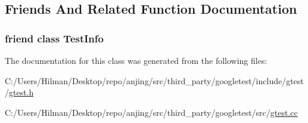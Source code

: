 \subsection{Friends And Related Function Documentation}
\hypertarget{classtesting_1_1_test_a4c49c2cdb6c328e6b709b4542f23de3c}{}
\subsubsection[{Test\+Info}]{\setlength{\rightskip}{0pt plus 5cm}friend class {\bf Test\+Info}\hspace{0.3cm}{\ttfamily [friend]}}\label{classtesting_1_1_test_a4c49c2cdb6c328e6b709b4542f23de3c}


The documentation for this class was generated from the following files\+:\begin{DoxyCompactItemize}
\item 
C\+:/\+Users/\+Hilman/\+Desktop/repo/anjing/src/third\+\_\+party/googletest/include/gtest/\hyperlink{gtest_8h}{gtest.\+h}\item 
C\+:/\+Users/\+Hilman/\+Desktop/repo/anjing/src/third\+\_\+party/googletest/src/\hyperlink{gtest_8cc}{gtest.\+cc}\end{DoxyCompactItemize}
